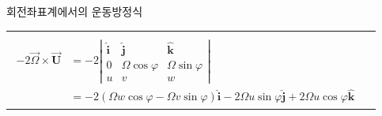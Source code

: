 \begin{frame}[t]{회전좌표계에서의 운동방정식}
\begin{tabular}{ll}
\begin{minipage}[t]{0.6\textwidth}
			$\boldsymbol {\vec{U}} = u \boldsymbol {\hat{i}} + v\boldsymbol {\hat{j}} + w\boldsymbol {\hat{k}}$이므로\\
			$${\displaystyle	{
				\begin{aligned}
					-2 \vec{\Omega} \times \boldsymbol{\vec{U}}
					& =
					-2\left|\begin{array}{ccc}\boldsymbol {\hat{i}} & \boldsymbol {\hat{j}} & \boldsymbol {\hat{k}} \\ 0 & \Omega \cos \varphi & \Omega \sin \varphi \\ u & v & w\end{array}\right|\\
					& =-2(\Omega w \cos \varphi-\Omega v \sin \varphi) \boldsymbol {\hat{i}}-2 \Omega u \sin \varphi \boldsymbol {\hat{j}}+2 \Omega u \cos \varphi \boldsymbol {\hat{k}}
				\end{aligned}
			}	}$$

		\end{minipage}
	\end{tabular}
\end{frame}



